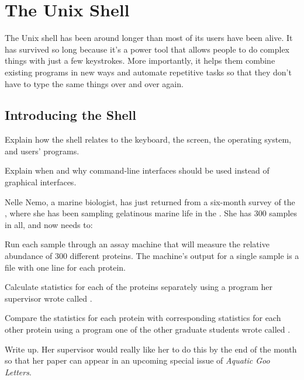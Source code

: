 \chapter{The Unix Shell}\label{s:shell}

The Unix shell has been around longer than most of its users have been
alive. It has survived so long because it's a power tool that allows
people to do complex things with just a few keystrokes. More
importantly, it helps them combine existing programs in new ways and
automate repetitive tasks so that they don't have to type the same
things over and over again.

\section{Introducing the Shell}

\begin{objectives}
\begin{swcitemize}
\item
  Explain how the shell relates to the keyboard, the screen, the
  operating system, and users' programs.
\item
  Explain when and why command-line interfaces should be used instead of
  graphical interfaces.
\end{swcitemize}
\end{objectives}

Nelle Nemo, a marine biologist, has just returned from a six-month
survey of the
, where she has been sampling gelatinous marine life in the
. She has 300 samples in all, and now needs to:

\begin{swcenumerate}
\item
  Run each sample through an assay machine that will measure the
  relative abundance of 300 different proteins. The machine's output for
  a single sample is a file with one line for each protein.
\item
  Calculate statistics for each of the proteins separately using a
  program her supervisor wrote called .
\item
  Compare the statistics for each protein with corresponding statistics
  for each other protein using a program one of the other graduate
  students wrote called .
\item
  Write up. Her supervisor would really like her to do this by the end
  of the month so that her paper can appear in an upcoming special issue
  of \emph{Aquatic Goo Letters}.
\end{swcenumerate}

